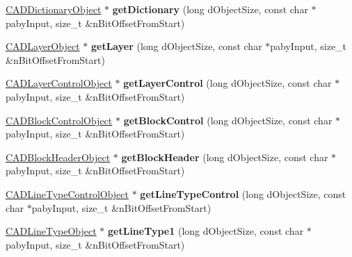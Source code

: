 \begin{DoxyCompactItemize}
\item 
\hyperlink{class_c_a_d_dictionary_object}{C\+A\+D\+Dictionary\+Object} $\ast$ {\bfseries get\+Dictionary} (long d\+Object\+Size, const char $\ast$paby\+Input, size\+\_\+t \&n\+Bit\+Offset\+From\+Start)\hypertarget{class_d_w_g_file_r2000_a8e6af59d453d136c6166084b3b8b03df}{}\label{class_d_w_g_file_r2000_a8e6af59d453d136c6166084b3b8b03df}

\item 
\hyperlink{class_c_a_d_layer_object}{C\+A\+D\+Layer\+Object} $\ast$ {\bfseries get\+Layer} (long d\+Object\+Size, const char $\ast$paby\+Input, size\+\_\+t \&n\+Bit\+Offset\+From\+Start)\hypertarget{class_d_w_g_file_r2000_ac361774a42901b5b8b9acd5a2e448f2b}{}\label{class_d_w_g_file_r2000_ac361774a42901b5b8b9acd5a2e448f2b}

\item 
\hyperlink{class_c_a_d_layer_control_object}{C\+A\+D\+Layer\+Control\+Object} $\ast$ {\bfseries get\+Layer\+Control} (long d\+Object\+Size, const char $\ast$paby\+Input, size\+\_\+t \&n\+Bit\+Offset\+From\+Start)\hypertarget{class_d_w_g_file_r2000_a9ba9433665d0387c54b8650f494b8575}{}\label{class_d_w_g_file_r2000_a9ba9433665d0387c54b8650f494b8575}

\item 
\hyperlink{class_c_a_d_block_control_object}{C\+A\+D\+Block\+Control\+Object} $\ast$ {\bfseries get\+Block\+Control} (long d\+Object\+Size, const char $\ast$paby\+Input, size\+\_\+t \&n\+Bit\+Offset\+From\+Start)\hypertarget{class_d_w_g_file_r2000_aea2099cdee7e8a9743c03dafc4760963}{}\label{class_d_w_g_file_r2000_aea2099cdee7e8a9743c03dafc4760963}

\item 
\hyperlink{class_c_a_d_block_header_object}{C\+A\+D\+Block\+Header\+Object} $\ast$ {\bfseries get\+Block\+Header} (long d\+Object\+Size, const char $\ast$paby\+Input, size\+\_\+t \&n\+Bit\+Offset\+From\+Start)\hypertarget{class_d_w_g_file_r2000_a4d5758b7c6f1d7ed3454f825210bbb9f}{}\label{class_d_w_g_file_r2000_a4d5758b7c6f1d7ed3454f825210bbb9f}

\item 
\hyperlink{class_c_a_d_line_type_control_object}{C\+A\+D\+Line\+Type\+Control\+Object} $\ast$ {\bfseries get\+Line\+Type\+Control} (long d\+Object\+Size, const char $\ast$paby\+Input, size\+\_\+t \&n\+Bit\+Offset\+From\+Start)\hypertarget{class_d_w_g_file_r2000_a5eafc3510664066fe9121f958d47ba4c}{}\label{class_d_w_g_file_r2000_a5eafc3510664066fe9121f958d47ba4c}

\item 
\hyperlink{class_c_a_d_line_type_object}{C\+A\+D\+Line\+Type\+Object} $\ast$ {\bfseries get\+Line\+Type1} (long d\+Object\+Size, const char $\ast$paby\+Input, size\+\_\+t \&n\+Bit\+Offset\+From\+Start)\hypertarget{class_d_w_g_file_r2000_adcc5c22bdea1c613a54ea7389db81d37}{}\label{class_d_w_g_file_r2000_adcc5c22bdea1c613a54ea7389db81d37}


\end{DoxyCompactItemize}
